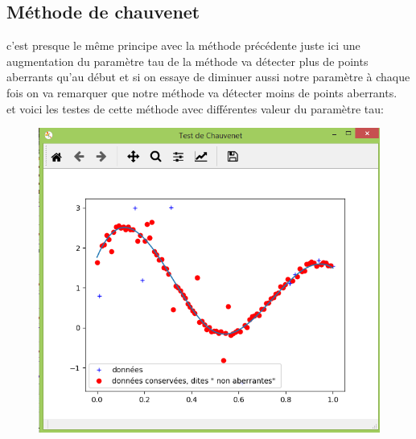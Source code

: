 \documentclass[11pt]{report}
\begin{document}
 
\newpage
\subsection*{Méthode de chauvenet}
c'est presque le même principe avec la méthode précédente juste ici une augmentation du paramètre tau de la méthode va  détecter plus de points aberrants qu'au début et  si on essaye de diminuer  aussi notre paramètre à chaque fois on va remarquer que notre méthode va détecter moins de points aberrants. \\ et voici les testes de cette méthode avec différentes valeur du paramètre tau: 
 \begin{figure}[!htb] %
 
% 
\includegraphics[width=\linewidth]{chauvn.PNG} %


\end{figure}
\end{document}
